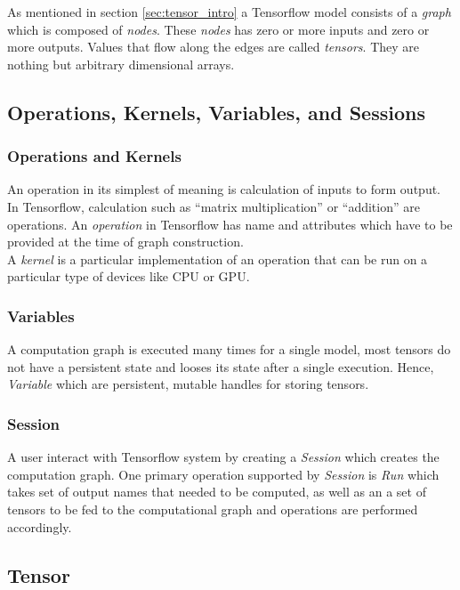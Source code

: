 \documentclass[12pt, a4paper]{report}
\begin{document}
As mentioned in section \ref{sec:tensor_intro} a Tensorflow model consists of a \textit{graph} which is composed of \textit{nodes}. These \textit{nodes} has zero or more inputs and zero or more outputs. Values that flow along the edges are called \textit{tensors}. They are nothing but arbitrary dimensional arrays.\\ \par

\subsection{Operations, Kernels, Variables, and Sessions}\label{sec:constituentsoftensorflow}

\subsubsection{Operations and Kernels}\label{sec:ops_kernel}
An operation in its simplest of meaning is calculation of inputs to form output. In Tensorflow, calculation such as ``matrix multiplication'' or ``addition'' are operations. An \textit{operation} in Tensorflow has name and attributes which have to be provided at the time of graph construction. \\ 

A \textit{kernel} is a particular implementation of an operation that can be run on a particular type of devices like CPU or GPU. 


\subsubsection{Variables}\label{variables}
A computation graph is executed many times for a single model, most tensors do not have a persistent state and looses its state after a single execution. Hence, \textit{Variable} which are persistent, mutable handles for storing tensors.


 \subsubsection{Session}\label{session}
A user interact with Tensorflow system by creating a \textit{Session} which creates the computation graph. One primary operation supported by \textit{Session} is \textit{Run} which takes set of output names that needed to be computed, as well as an a set of tensors to be fed to the computational graph and operations are performed accordingly.

\subsection{Tensor}\label{tensor}
\end{document}

